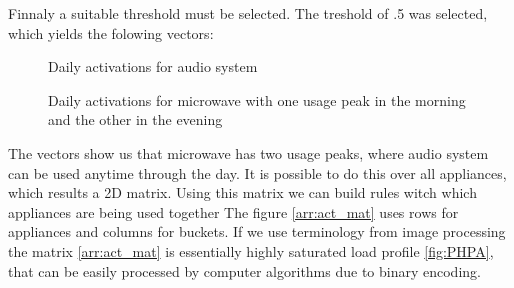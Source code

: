 Finnaly a suitable threshold must be selected.
The treshold of .5 was selected, which yields the folowing vectors:

\begin{figure}[H]
    \centering
    \caption{Daily activations for audio system}
    \label{arr:as_acts_vec}
\end{figure}

\begin{figure}[H]
    \centering
    \caption{Daily activations for microwave with one usage peak in the morning and the other in the evening}
    \label{arr:microwave_acts_vec}
\end{figure}

The vectors show us that microwave has two usage peaks, where audio system can be used anytime through the day.
It is possible to do this over all appliances, which results a 2D matrix. 
Using this matrix we can build rules witch which appliances are being used together
The figure \ref{arr:act_mat} uses rows for appliances and columns for buckets.  
If we use terminology from image processing the matrix \ref{arr:act_mat} is essentially highly saturated load profile \ref{fig:PHPA},
that can be easily processed by computer algorithms due to binary encoding. 


